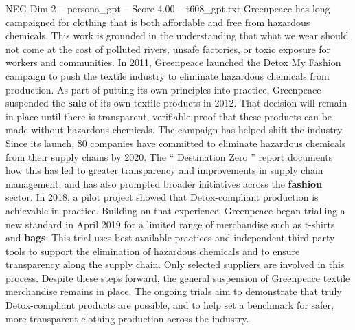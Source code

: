 \begin{textsample}{NEG Dim 2 – persona\_gpt – Score 4.00 – t608\_gpt.txt}  \label{ex:f2_neg_046}
Greenpeace has long campaigned for clothing that is both affordable and free from hazardous chemicals.
This work is grounded in the understanding that what we wear should not come at the cost of polluted rivers, unsafe factories, or toxic exposure for workers and communities.
In 2011, Greenpeace launched the Detox My Fashion campaign to push the textile industry to eliminate hazardous chemicals from production.
As part of putting its own principles into practice, Greenpeace suspended the \textbf{sale} of its own textile products in 2012.
That decision will remain in place until there is transparent, verifiable proof that these products can be made without hazardous chemicals.
The campaign has helped shift the industry.
Since its launch, 80 companies have committed to eliminate hazardous chemicals from their supply chains by 2020.
The “ Destination Zero ” report documents how this has led to greater transparency and improvements in supply chain management, and has also prompted broader initiatives across the \textbf{fashion} sector.
In 2018, a pilot project showed that Detox-compliant production is achievable in practice.
Building on that experience, Greenpeace began trialling a new standard in April 2019 for a limited range of merchandise such as t-shirts and \textbf{bags}.
This trial uses best available practices and independent third-party tools to support the elimination of hazardous chemicals and to ensure transparency along the supply chain.
Only selected suppliers are involved in this process.
Despite these steps forward, the general suspension of Greenpeace textile merchandise remains in place.
The ongoing trials aim to demonstrate that truly Detox-compliant products are possible, and to help set a benchmark for safer, more transparent clothing production across the industry.

\end{textsample}
